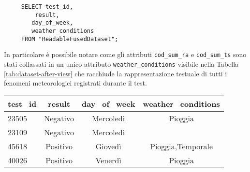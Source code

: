 \begin{itemize}
\begin{lstlisting}
	 SELECT test_id, 
		 result, 
		day_of_week, 
		weather_conditions
	 FROM "ReadableFusedDataset";

	\end{lstlisting}

	In particolare è possibile notare come gli attributi \texttt{cod\_sum\_ra} e 
	\texttt{cod\_sum\_ts} sono stati collassati in un unico attributo 
	\texttt{weather\_conditions} visibile nella Tabella 
	\ref{tab:dataset-after-view} che racchiude la rappresentazione testuale di 
	tutti i fenomeni meteorologici registrati durante il test.

	\vspace{.5em}
	\begin{centering}
		\begin{tabular}{lccc}
			\toprule
			test\_id & result & day\_of\_week & weather\_conditions \\
			\midrule
			23505 & Negativo & Mercoledì & {Pioggia} \\
			23109 &	Negativo & Mercoledì & {} \\
			45618 &	Positivo & Giovedì & {Pioggia,Temporale} \\
			40026 &	Positivo & Venerdì & {Pioggia} \\
			\bottomrule
		\end{tabular}
		\label{tab:dataset-after-view}
	\end{centering}

\end{itemize}

